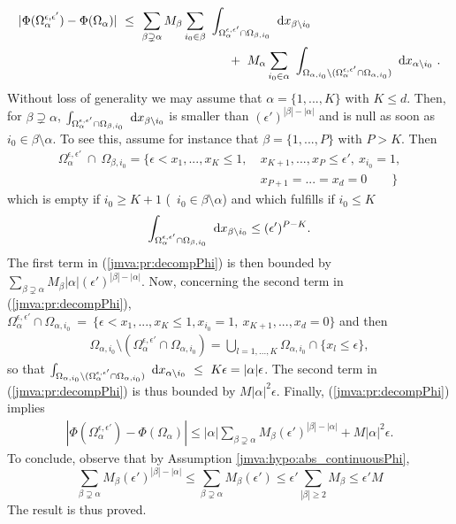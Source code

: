 \begin{align}
\label{jmva:pr:decompPhi}
|\Phi(\Omega_\alpha^{\epsilon, \epsilon'}) - \Phi(\Omega_\alpha)| &~\le~ \sum_{\beta \supsetneq \alpha} M_\beta \sum_{i_0 \in \beta} ~\int_{\Omega_\alpha^{\epsilon, \epsilon'} \cap \Omega_{\beta,i_0}} ~\mathrm{d} x_{\beta \setminus i_0}\\
\nonumber&~~~~~~~~~~~~~~~~~~~~~~~~~~~+~ M_\alpha \sum_{i_0 \in \alpha} ~\int_{\Omega_{\alpha,i_0} \setminus (\Omega_\alpha^{\epsilon, \epsilon'} \cap \Omega_{\alpha,i_0})}  ~\mathrm{d} x_{\alpha \setminus i_0}~.
\end{align}
Without loss of generality we may assume that $\alpha =\{1,...,K\}$ with $K \le d$. 
Then, for $\beta \supsetneq \alpha$, $\int_{\Omega_\alpha^{\epsilon, \epsilon'} \cap \Omega_{\beta,i_0}} ~\mathrm{d} x_{\beta \setminus i_0}$ is smaller than $(\epsilon')^{|\beta| - |\alpha|}$ and is null as soon as $i_0 \in \beta \setminus \alpha$. To see this, assume for instance that $\beta = \{1,...,P\}$ with $P>K$. Then 
\begin{align*}
\Omega_\alpha^{\epsilon, \epsilon'} ~\cap~ \Omega_{\beta,i_0} = \{ \epsilon < x_1,...,x_K \le 1,~&x_{K+1},...,x_P \le \epsilon' ,~x_{i_0}=1,\\ &x_{P+1}=...=x_d=0~~~~~~~~~\}
\end{align*}
which is empty if $i_0 \ge K+1$ (\ie~$i_0 \in \beta \setminus \alpha$) and which fulfills if $i_0 \le K$ $$\int_{\Omega_\alpha^{\epsilon, \epsilon'} \cap \Omega_{\beta,i_0}} ~\mathrm{d} x_{\beta \setminus i_0} \le (\epsilon')^{P-K}.$$
The first term in (\ref{jmva:pr:decompPhi}) is then bounded by $\sum_{\beta \supsetneq \alpha } M_\beta |\alpha| (\epsilon')^{|\beta|-|\alpha|}$.
Now, concerning the second term in (\ref{jmva:pr:decompPhi}), $\Omega_{\alpha}^{\epsilon, \epsilon'} \cap \Omega_{\alpha,i_0} ~=~\{\epsilon < x_1,...,x_K \le 1, x_{i_0}=1,~x_{K+1},...,x_d=0 \} $ and then
\begin{align*}
\Omega_{\alpha,i_0} \setminus (\Omega_\alpha^{\epsilon, \epsilon'} \cap \Omega_{\alpha,i_0}) = \bigcup_{l=1,...,K} \Omega_{\alpha,i_0} \cap \{ x_l \le \epsilon \},
\end{align*}
so that $\int_{\Omega_{\alpha,i_0} \setminus (\Omega_\alpha^{\epsilon, \epsilon'} \cap \Omega_{\alpha,i_0})}  ~\mathrm{d} x_{\alpha \setminus i_0}~ \le~ K\epsilon = |\alpha| \epsilon$.
The second term in (\ref{jmva:pr:decompPhi}) is thus bounded by $M |\alpha|^2 \epsilon$.
Finally, %
(\ref{jmva:pr:decompPhi}) implies 
\begin{align*}
|\Phi(\Omega_\alpha^{\epsilon, \epsilon'}) - \Phi(\Omega_\alpha)| \le |\alpha|  \sum_{\beta \supsetneq \alpha} M_\beta (\epsilon')^{|\beta|-|\alpha|} + M |\alpha|^2 \epsilon.
\end{align*}
To conclude, observe that by Assumption \ref{jmva:hypo:abs_continuousPhi},
$$\sum_{\beta \supsetneq \alpha} M_\beta (\epsilon')^{|\beta|-|\alpha|} \le \sum_{\beta \supsetneq \alpha} M_\beta (\epsilon') \le \epsilon' \sum_{|\beta| \ge 2} M_\beta \le \epsilon' M
$$
The result is thus proved.

